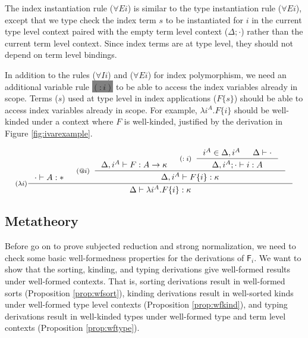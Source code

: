 \documentclass[preprint]{sigplanconf}
\newcommand{\newFi}[1]{\colorbox{grey}{\ensuremath{#1}}}
\newcommand{\Fi}{\ensuremath{\mathsf{F}_i}}
\theoremstyle{plain}
\theoremstyle{remark}
\theoremstyle{definition}
\begin{document}
The index instantiation rule ($\forall E i$) is similar to
the type instantiation rule ($\forall E i$), except that
we type check the index term $s$ to be instantiated for $i$
in the current type level context paired with the empty term level context
($\Delta;\cdot$) rather than the current term level context.
Since index terms are at type level, they should not depend on
term level bindings.

In addition to the rules ($\forall I i$) and ($\forall E i$) for
index polymorphism, we need an additional variable rule \newFi{(:i)}
to be able to access the index variables already in scope. Terms ($s$) used
at type level in index applications ($F\{s\}$) should be able to access
index variables already in scope. For example, $\lambda i^A.F\{i\}$ should be
well-kinded under a context where $F$ is well-kinded,
justified by the derivation in Figure \ref{fig:ivarexample}.
\begin{figure*}
\[ \inference[($\lambda i$)]
      { \cdot |- A:* &
	\inference[($@i$)]{ \Delta, i^A |- F : A -> \kappa
                          & \inference[($:i$)]{ i^A\in \Delta,i^A
                                              & \Delta |- \cdot }
                                              {\Delta,i^A;\cdot |- i:A}
                          }
                          {\Delta, i^A |- F\{i\} : \kappa} }
      {\Delta |- \lambda i^A.F\{i\} :\kappa}
\]
\caption{Kinding derivation for an index abstraction}
\label{fig:ivarexample}
\end{figure*}




\subsection{Metatheory}

Before go on to prove subjected reduction and strong normalization, we need to
check some basic well-formedness properties for the derivations of \Fi.
We want to show that the sorting, kinding, and typing derivations give
well-formed results under well-formed contexts. That is, sorting derivations
result in well-formed sorts (Proposition \ref{prop:wfsort}),
kinding derivations result in well-sorted kinds under well-formed
type level contexts (Proposition \ref{prop:wfkind}), and typing derivations
result in well-kinded types under well-formed type and term level contexts
(Proposition \ref{prop:wftype}).
\end{document}
